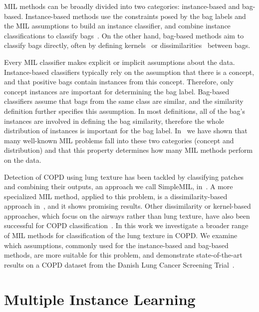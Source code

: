 \documentclass[10pt,conference,a4paper]{IEEEtran}
\begin{document}
MIL methods can be broadly divided into two categories: instance-based and bag-based. Instance-based methods use the constraints posed by the bag labels and the MIL assumptions to build an instance classifier, and combine instance classifications to classify bags~\cite{maron1998framework,zhang2001dd,andrews2002support,viola2006multiple}. On the other hand, bag-based methods aim to classify bags directly, often by defining kernels~\cite{gartner2002multi} or dissimilarities~\cite{tax2011bag,zhang2009multi2} between bags.

Every MIL classifier makes explicit or implicit assumptions about the data. Instance-based classifiers typically rely on the assumption that there is a concept, and that positive bags contain instances from this concept. Therefore, only concept instances are important for determining the bag label. Bag-based classifiers assume that bags from the same class are similar, and the similarity definition further specifies this assumption. In most definitions, all of the bag's instances are involved in defining the bag similarity, therefore the whole distribution of instances is important for the bag label. In~\cite{cheplygina2012does} we have shown that many well-known MIL problems fall into these two categories (concept and distribution) and that this property determines how many MIL methods perform on the data.

Detection of COPD using lung texture has been tackled by classifying patches and combining their outputs, an approach we call SimpleMIL, in~\cite{sorensen2012texture}. A more specialized MIL method, applied to this problem, is a dissimilarity-based approach in~\cite{sorensen2010image}, and it shows promising results. Other dissimilarity or kernel-based approaches, which focus on the airways rather than lung texture, have also been successful for COPD classification~\cite{sorensen2011dissimilarity,feragen2013geometric}. In this work we investigate a broader range of MIL methods for classification of the lung texture in COPD. We examine which assumptions, commonly used for the instance-based and bag-based methods, are more suitable for this problem, and demonstrate state-of-the-art results on a COPD dataset from the Danish Lung Cancer Screening Trial~\cite{pedersen2009danish}.





\section{Multiple Instance Learning}\label{sec:mil}
\end{document}
